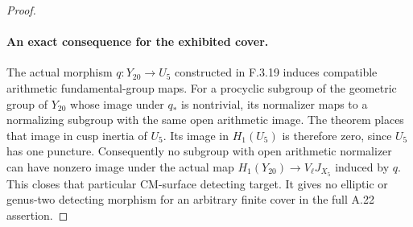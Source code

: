 \begin{proof}
\paragraph{An exact consequence for the exhibited cover.}
The actual morphism $q:Y_{20}\to U_5$ constructed in
F.3.19 induces compatible arithmetic fundamental-group
maps. For a procyclic subgroup of the geometric group of
$Y_{20}$ whose image under $q_*$ is nontrivial, its
normalizer maps to a normalizing subgroup with the same
open arithmetic image. The theorem places that image
in cusp inertia of $U_5$. Its image in $H_1(U_5)$ is
therefore zero, since $U_5$ has one puncture. Consequently
no subgroup with open arithmetic normalizer can have
nonzero image under the actual map
$H_1(Y_{20})\to V_\ell J_{X_5}$ induced by $q$.
This closes that particular CM-surface detecting target.
It gives no elliptic or genus-two detecting morphism for
an arbitrary finite cover in the full A.22 assertion.
\end{proof}

